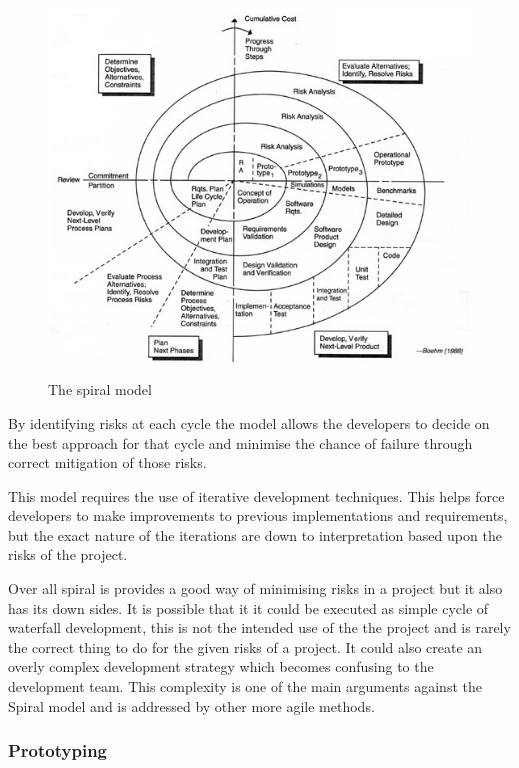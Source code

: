 \documentclass[11pt,a4paper]{article}
\begin{document}
\begin{figure}[h]
\begin{center}
\includegraphics[scale=2.5]{spiral.jpeg}
\label{img:spiral}
\caption{The spiral model \cite{spiral}}
\end{center}
\end{figure}

By identifying risks at each cycle the model allows the developers to decide on the best approach for that cycle and minimise the chance of failure through correct mitigation of those risks. 

This model requires the use of iterative development techniques. This helps force developers to make improvements to previous implementations and requirements, but the exact nature of the iterations are down to interpretation based upon the risks of the project.

Over all spiral is provides a good way of minimising risks in a project but it also has its down sides. It is possible that it it could be executed as simple cycle of waterfall development, this is not the intended use of the the project and is rarely the correct thing to do for the given risks of a project. It could also create an overly complex development strategy which becomes confusing to the development team. This complexity is one of the main arguments against the Spiral model and is addressed by other more agile methods. 

\subsubsection{Prototyping}
\end{document}
